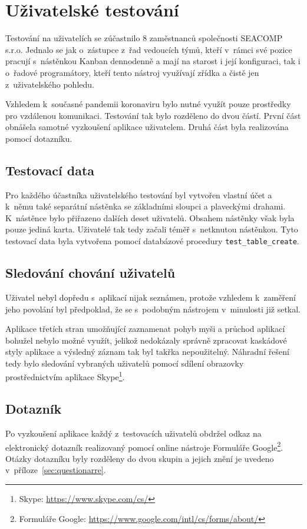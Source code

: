 \section{Uživatelské testování}
Testování na uživatelích se zúčastnilo 8 zaměstnanců společnosti SEACOMP s.r.o. Jednalo se jak o~zástupce z~řad vedoucích týmů, kteří v~rámci své pozice pracují s~nástěnkou Kanban dennodenně a mají na starost i její konfiguraci, tak i o~řadové programátory, kteří tento nástroj využívají zřídka a čistě jen z~uživatelského pohledu.

Vzhledem k~současné pandemii koronaviru bylo nutné využít pouze prostředky pro vzdálenou komunikaci. Testování tak bylo rozděleno do dvou částí. První část obnášela samotné vyzkoušení aplikace uživatelem. Druhá část byla realizována pomocí dotazníku.

\subsection{Testovací data}
Pro každého účastníka uživatelského testování byl vytvořen vlastní účet a k~němu také separátní nástěnka se základními sloupci a plaveckými drahami. K~nástěnce bylo přiřazeno dalších deset uživatelů. Obsahem nástěnky však byla pouze jediná karta. Uživatelé tak tedy začali téměř s~netknutou nástěnkou. Tyto testovací data byla vytvořena pomocí databázové procedury \texttt{test\_table\_create}.

\subsection{Sledování chování uživatelů}
Uživatel nebyl dopředu s~aplikací nijak seznámen, protože vzhledem k~zaměření jeho povolání byl předpoklad, že se s~podobným nástrojem v~minulosti již setkal. 

Aplikace třetích stran umožňující zaznamenat pohyb myši a průchod aplikací bohužel nebylo možné využít, jelikož nedokázaly správně zpracovat kaskádové styly aplikace a výsledný záznam tak byl takřka nepoužitelný. Náhradní řešení tedy bylo sledování vybraných uživatelů pomocí sdílení obrazovky prostřednictvím aplikace Skype\footnote{Skype: \url{https://www.skype.com/cs/}}.

\subsection{Dotazník}
Po vyzkoušení aplikace každý z~testovacích uživatelů obdržel odkaz na elektronický dotazník realizovaný pomocí online nástroje Formuláře Google\footnote{Formuláře Google: \url{https://www.google.com/intl/cs/forms/about/}}. Otázky dotazníku byly rozděleny do dvou skupin a jejich znění je uvedeno v~příloze~\ref{sec:questionarre}.

